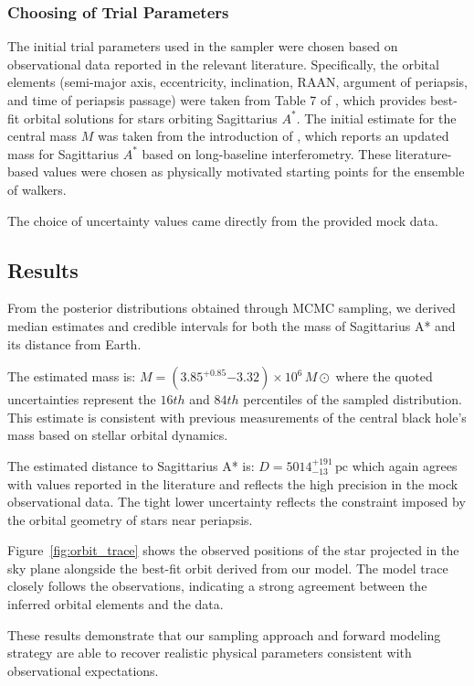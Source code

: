 \documentclass[linenumbers,trackchanges,astrosymb,]{aastex7}
\begin{document}
\subsubsection{Choosing of Trial Parameters}

The initial trial parameters used in the sampler were chosen based on observational data reported in the relevant literature. Specifically, the orbital elements (semi-major axis, eccentricity, inclination, RAAN, argument of periapsis, and time of periapsis passage) were taken from Table 7 of \citep{Gillessen2009}, which provides best-fit orbital solutions for stars orbiting Sagittarius $A^*$. The initial estimate for the central mass $M$ was taken from the introduction of \citep{Gravity2018}, which reports an updated mass for Sagittarius $A^*$ based on long-baseline interferometry. These literature-based values were chosen as physically motivated starting points for the ensemble of walkers.

The choice of uncertainty values came directly from the provided mock data.

\subsection{Results}

From the posterior distributions obtained through MCMC sampling, we derived median estimates and credible intervals for both the mass of Sagittarius A* and its distance from Earth.

The estimated mass is:
$M = (3.85^{+0.85}{-3.32}) \times 10^6 \, M\odot$
where the quoted uncertainties represent the $16th$ and $84th$ percentiles of the sampled distribution. This estimate is consistent with previous measurements of the central black hole’s mass based on stellar orbital dynamics.

The estimated distance to Sagittarius A* is:
$D = 5014^{+191}_{-13} \, \text{pc}$
which again agrees with values reported in the literature and reflects the high precision in the mock observational data. The tight lower uncertainty reflects the constraint imposed by the orbital geometry of stars near periapsis.

Figure~\ref{fig:orbit_trace} shows the observed positions of the star projected in the sky plane alongside the best-fit orbit derived from our model. The model trace closely follows the observations, indicating a strong agreement between the inferred orbital elements and the data.

These results demonstrate that our sampling approach and forward modeling strategy are able to recover realistic physical parameters consistent with observational expectations.
\end{document}
